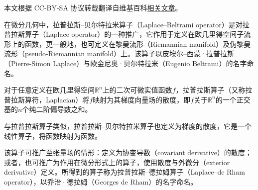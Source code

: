 
本文根据 CC-BY-SA 协议转载翻译自维基百科\href{https://en.wikipedia.org/wiki/Laplace\%E2\%80\%93Beltrami_operator}{相关文章}。

在微分几何中，拉普拉斯–贝尔特拉米算子（Laplace–Beltrami operator）是对拉普拉斯算子（Laplace operator）的一种推广，它作用于定义在欧几里得空间子流形上的函数，更一般地，也可定义在黎曼流形（Riemannian manifold）及伪黎曼流形（pseudo-Riemannian manifold）上。该算子以皮埃尔–西蒙·拉普拉斯（Pierre-Simon Laplace）与欧金尼奥·贝尔特拉米（Eugenio Beltrami）的名字命名。

对于任意定义在欧几里得空间$\mathbb{R}^{n}$上的二次可微实值函数$f$，拉普拉斯算子（又称拉普拉斯算符，Laplacian）将$f$映射为其梯度向量场的散度，即$f$关于$\mathbb{R}^{n}$的一个正交基的$n$个纯二阶偏导数之和。

与拉普拉斯算子类似，拉普拉斯–贝尔特拉米算子也定义为梯度的散度，它是一个线性算子，将函数映射为函数。

该算子可推广至张量场的情形：定义为协变导数（covariant derivative）的散度；或者，也可推广为作用在微分形式上的算子，使用散度与外微分（exterior derivative）定义。所得到的算子称为拉普拉斯–德拉姆算子（Laplace–de Rham operator），以乔治·德拉姆（Georges de Rham）的名字命名。
